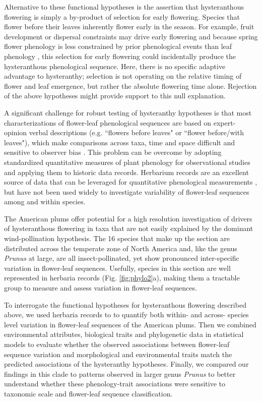 \documentclass{article}[12pt]
\begin{document}
Alternative to these functional hypotheses is the assertion that hysteranthous flowering is simply a by-product of selection for early flowering. Species that flower before their leaves inherently flower early in the season. For example, fruit development or dispersal constraints may drive early flowering \citep{Primack1987} and because spring flower phenology is less constrained by prior phenological events than leaf phenology \citep{Savage2019,Ettinger2018}, this selection for early flowering could incidentally produce the hysteranthous phenological sequence. Here, there is no specific adaptive advantage to hysteranthy;  selection is not operating on the relative timing of flower and leaf emergence, but rather the absolute flowering time alone. Rejection of the above hypotheses might provide support to this null explanation. 

\noindent A significant challenge for robust testing of hysteranthy hypotheses is that most characterizations of flower-leaf phenological sequences are based on expert-opinion verbal descriptions (e.g. ``flowers before leaves" or ``flower before/with leaves"), which make comparisons across taxa, time and space difficult and sensitive to observer bias  \citep[see;][]{Buonaiuto2020}. This problem can be overcome by adopting standardized quantitative measures of plant phenology for observational studies and applying them to historic data records. Herbarium records are an excellent source of data that can be leveraged for quantitative phenological measurements \citep{Willis2017}, but have not been used widely to investigate variability of flower-leaf sequences among and within species.

\noindent The American plums offer potential for a high resolution investigation of drivers of hysteranthous flowering in taxa that are not easily explained by the dominant wind-pollination hypothesis. The 16 species that make up the section are distributed across the temperate zone of North America and, like the genus \textit{Prunus} at large, are all insect-pollinated, yet show pronounced inter-specific variation in flower-leaf sequences. Usefully, species in this section are well represented in herbaria records (Fig. \ref{fig:phylo2}a), making them a tractable group to measure and assess variation in flower-leaf sequences.

\noindent To interrogate the functional hypotheses for hysteranthous flowering described above, we used herbaria records to to quantify both within- and across- species level variation in flower-leaf sequences of the American plums. Then we combined environmental attributes, biological traits and phylogenetic data in statistical models to evaluate whether the observed associations between flower-leaf sequence variation and morphological and environmental traits match the predicted associations of the hysteranthy hypotheses. Finally, we compared our findings in this clade to patterns observed in larger genus \emph{Prunus} to better understand whether these phenology-trait associations were sensitive to taxonomic scale and flower-leaf sequence classification.
\end{document}

